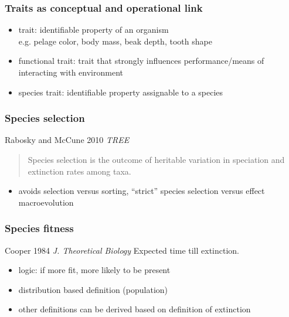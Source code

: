 \documentclass{beamer}
\begin{document}
\begin{frame}
  \frametitle{Traits as conceptual and operational link}

  \begin{definition}
    \begin{itemize}
      \item \alert{trait}: identifiable property of an organism \\e.g. pelage color, body mass, beak depth, tooth shape
      \item \alert{functional trait}: trait that strongly influences performance/means of interacting with environment
      \item \alert{species trait}: identifiable property assignable to a species
    \end{itemize}
  \end{definition}
\end{frame}

\begin{frame}
  \frametitle{Species selection}

  \begin{alertblock}{Rabosky and McCune 2010 \em{TREE}}
    \begin{quote}
      Species selection is the outcome of heritable variation in speciation and extinction rates among taxa.
    \end{quote}
  \end{alertblock}

  \begin{itemize}
    \item avoids selection versus sorting, ``strict'' species selection versus effect macroevolution
  \end{itemize}
\end{frame}

\begin{frame}
  \frametitle{Species fitness}

  \begin{alertblock}{Cooper 1984 \em{J. Theoretical Biology}}
    Expected time till extinction.
  \end{alertblock}


  \begin{itemize}
    \item \alert{logic:} if more fit, more likely to be present
    \item distribution based definition (population)
    \item other definitions can be derived based on definition of extinction
  \end{itemize}

\end{frame}
\end{document}
